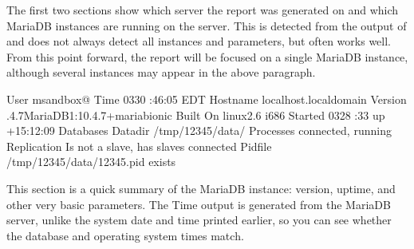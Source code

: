 \documentclass[letterpaper,10pt,english]{sphinxmanual}
\begin{document}
\sphinxAtStartPar
The first two sections show which server the report was generated on and which
MariaDB instances are running on the server. This is detected from the output of
 and does not always detect all instances and parameters, but often works
well.  From this point forward, the report will be focused on a single MariaDB
instance, although several instances may appear in the above paragraph.

\begin{sphinxVerbatim}[commandchars=\\\{\}]
                     User  msandbox@\PYGZpc{}
                     Time  \PYGZhy{}03\PYGZhy{}30 :46:05 EDT
                 Hostname  localhost.localdomain
                  Version  .4.7\PYGZhy{}MariaDB\PYGZhy{}1:10.4.7+maria\PYGZti{}bionic
                 Built On  linux2.6 i686
                  Started  \PYGZhy{}03\PYGZhy{}28 :33 up +15:12:09
                Databases  
                  Datadir  /tmp/12345/data/
                Processes   connected,  running
              Replication  Is not a slave, has  slaves connected
                  Pidfile  /tmp/12345/data/12345.pid exists
\end{sphinxVerbatim}

\sphinxAtStartPar
This section is a quick summary of the MariaDB instance: version, uptime, and
other very basic parameters. The Time output is generated from the MariaDB server,
unlike the system date and time printed earlier, so you can see whether the
database and operating system times match.
\end{document}
